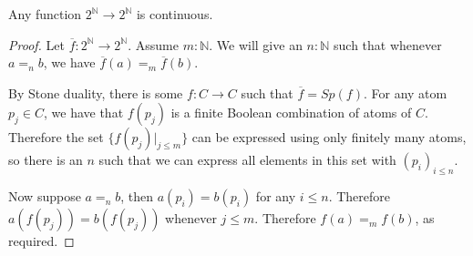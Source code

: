 \begin{lemma}
  Any function $2^\mathbb N\to 2^\mathbb N$ is continuous. 
\end{lemma} 
\begin{proof}
  Let $\overline f : 2^\mathbb N \to 2^\mathbb N$. 
  Assume $m :\mathbb N$. We will give an $n:\mathbb N$ such that 
  whenever $a=_n b$, we have $\overline f(a) =_m \overline f(b)$. 

  By Stone duality, there is some $f: C \to C$ such that $\overline f = Sp(f)$. 
  For any atom $p_j\in C$, we have that $f(p_j)$ is a finite Boolean combination
  of atoms of $C$.
  Therefore the set $\{f(p_j)|_{j\leq m}\} $ can be expressed using only
  finitely many atoms, so there is an $n$ such that we can express 
  all elements in this set with $(p_i)_{i\leq n}$. 

  Now suppose $a=_n b$, then $a(p_i) = b(p_i)$ for any $i \leq n$. 
  Therefore $a(f(p_j)) = b(f(p_j))$ whenever $j\leq m$. 
  Therefore $f(a) =_m f(b)$, as required. 


\end{proof}
